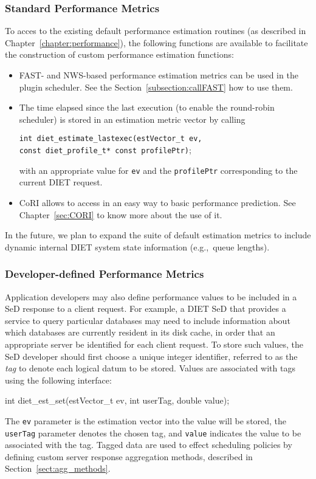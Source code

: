 \subsubsection{Standard Performance Metrics}

To acces to the existing default performance estimation
routines (as described in Chapter~\ref{chapter:performance}), the following
functions are available to facilitate the construction of custom
performance estimation functions:
\begin{itemize}
\item FAST- and NWS-based performance estimation metrics can be used in the plugin scheduler. 
See the Section~\ref{subsection:callFAST} how to use them.
\item The time elapsed since the last execution (to enable
  the round-robin scheduler) is stored in an estimation metric vector
  by calling
  \begin{tabbing}
    \texttt{int diet\_estimate\_lastexec(}\=\texttt{estVector\_t ev,} \\
    \> \texttt{const diet\_profile\_t* const profilePtr)};
  \end{tabbing}
  with an appropriate value for \texttt{ev} and the
  \texttt{profilePtr} corresponding to the current DIET request.
\item CoRI allows to access in an easy way to basic performance 
prediction. See Chapter~\ref{sec:CORI} to know more about the use of it.

\end{itemize}

In the future, we plan to expand the suite of default estimation
metrics to include dynamic internal DIET system state information
(e.g.,~queue lengths).

\subsubsection{Developer-defined Performance Metrics}

Application developers may also define performance values to be
included in a SeD response to a client request.  For example, a DIET
SeD that provides a service to query particular databases may need
to include information about which databases are currently resident in
its disk cache, in order that an appropriate server be identified for
each client request.  To store such values, the SeD developer should
first choose a unique integer identifier, referred to as the
\emph{tag} to denote each logical datum to be stored.  Values are
associated with tags using the following interface:
\begin{code}
int diet\_est\_set(estVector\_t ev, int userTag, double value);
\end{code}
The \texttt{ev} parameter is the estimation vector into the
value will be stored, the \texttt{userTag} parameter denotes the
chosen tag, and \texttt{value} indicates the value to be associated
with the tag.  Tagged data are used to effect
scheduling policies by defining custom server response
aggregation methods, described in Section~\ref{sect:agg_methods}.

